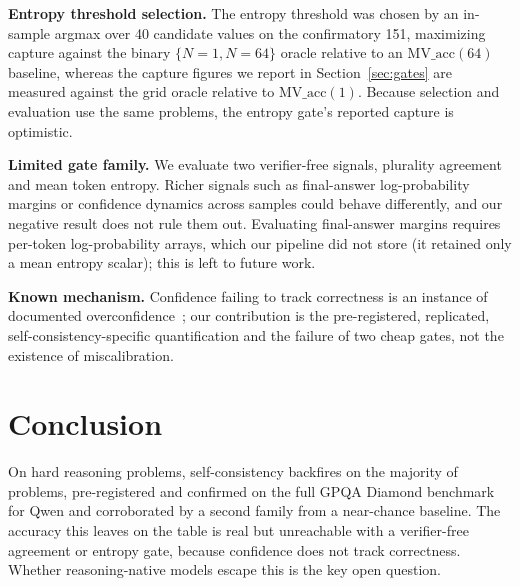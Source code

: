 \documentclass{article}
\begin{document}
\textbf{Entropy threshold selection.} The entropy threshold was chosen by an
in-sample argmax over 40 candidate values on the confirmatory 151, maximizing
capture against the binary $\{N=1, N=64\}$ oracle relative to an
$\text{MV\_acc}(64)$ baseline, whereas the capture figures we report in
Section~\ref{sec:gates} are measured against the grid oracle relative to
$\text{MV\_acc}(1)$. Because selection and evaluation use the same problems,
the entropy gate's reported capture is optimistic.

\textbf{Limited gate family.} We evaluate two verifier-free signals, plurality
agreement and mean token entropy. Richer signals such as final-answer log-probability
margins or confidence dynamics across samples could behave differently, and our
negative result does not rule them out. Evaluating final-answer margins requires
per-token log-probability arrays, which our pipeline did not store (it retained only a
mean entropy scalar); this is left to future work.

\textbf{Known mechanism.} Confidence failing to track correctness is an
instance of documented overconfidence~\citep{guo2017calibration,
kadavath2022language}; our contribution is the pre-registered, replicated,
self-consistency-specific quantification and the failure of two cheap gates,
not the existence of miscalibration.

\section{Conclusion}

On hard reasoning problems, self-consistency backfires on the majority of
problems, pre-registered and confirmed on the full GPQA Diamond benchmark for
Qwen and corroborated by a second family from a near-chance baseline. The
accuracy this leaves on the table is real but unreachable with a verifier-free
agreement or entropy gate, because confidence
does not track correctness. Whether reasoning-native models escape this is the
key open question.



\end{document}
